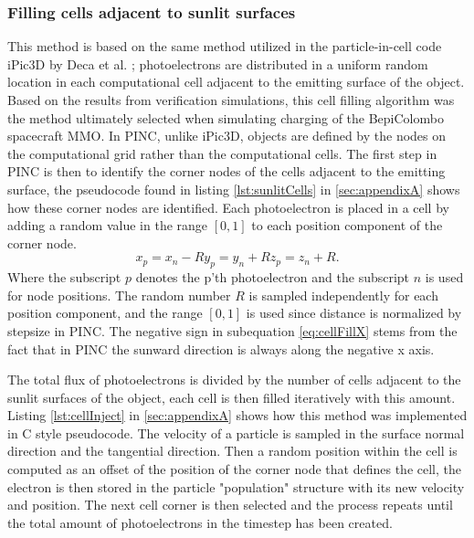 \subsubsection*{Filling cells adjacent to sunlit surfaces}
This method is based on the same method utilized in the particle-in-cell code iPic3D by Deca et al. \parencite{Deca2013}; photoelectrons are distributed in a uniform random location in each computational cell adjacent to the emitting surface of the object. Based on the results from verification simulations, this cell filling algorithm was the method ultimately selected when simulating charging of the BepiColombo spacecraft MMO. In PINC, unlike iPic3D, objects are defined by the nodes on the computational grid rather than the computational cells. The first step in PINC is then to identify the corner nodes of the cells adjacent to the emitting surface, the pseudocode found in listing \ref{lst:sunlitCells} in \cref{sec:appendixA} shows how these corner nodes are identified. Each photoelectron is placed in a cell by adding a random value in the range $[0,1]$ to each position component of the corner node. 
\begin{subequations}
    \begin{equation}\label{eq:cellFillX}
        x_{p} = x_{n} - R
    \end{equation}
    \begin{equation}
        y_{p} = y_{n} + R
    \end{equation}
    \begin{equation}
        z_{p} = z_{n} + R.
    \end{equation}
\end{subequations}
Where the subscript $p$ denotes the p'th photoelectron and the subscript $n$ is used for node positions. The random number $R$ is sampled independently for each position component, and the range $[0,1]$ is used since distance is normalized by stepsize in PINC. The negative sign in subequation \eqref{eq:cellFillX} stems from the fact that in PINC the sunward direction is always along the negative x axis.

The total flux of photoelectrons is divided by the number of cells adjacent to the sunlit surfaces of the object, each cell is then filled iteratively with this amount. Listing \ref{lst:cellInject} in \cref{sec:appendixA} shows how this method was implemented in C style pseudocode. The velocity of a particle is sampled in the surface normal direction and the tangential direction. Then a random position within the cell is computed as an offset of the position of the corner node that defines the cell, the electron is then stored in the particle "population" structure with its new velocity and position. The next cell corner is then selected and the process repeats until the total amount of photoelectrons in the timestep has been created.


